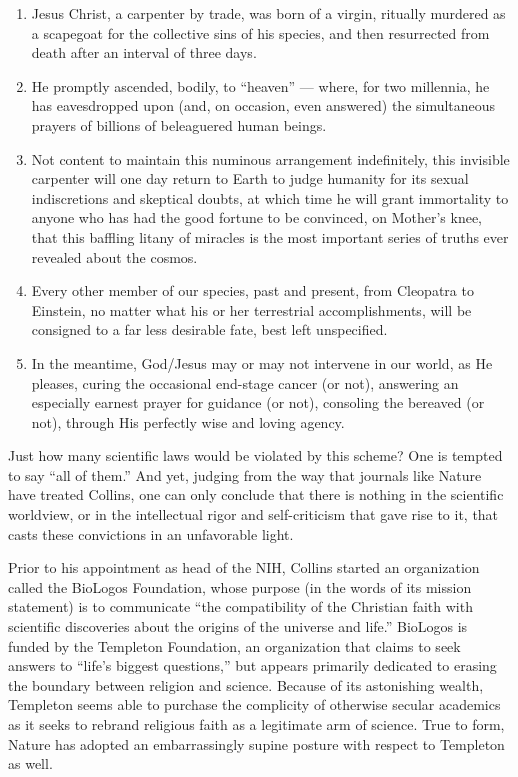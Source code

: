 \documentclass[a4paper,14pt]{extarticle}
\begin{document}
\begin{enumerate}
      \item
            Jesus Christ, a carpenter by trade, was born of a virgin, ritually murdered as a scapegoat for the collective sins of his species, and then resurrected from death after an interval of three days.
      \item
            He promptly ascended, bodily, to ``heaven'' --- where, for two millennia, he has eavesdropped upon (and, on occasion, even answered) the simultaneous prayers of billions of beleaguered human beings.
      \item
            Not content to maintain this numinous arrangement indefinitely, this invisible carpenter will one day return to Earth to judge humanity for its sexual indiscretions and skeptical doubts, at which time he will grant immortality to anyone who has had the good fortune to be convinced, on Mother’s knee, that this baffling litany of miracles is the most important series of truths ever revealed about the cosmos.
      \item
            Every other member of our species, past and present, from Cleopatra to Einstein, no matter what his or her terrestrial accomplishments, will be consigned to a far less desirable fate, best left unspecified.
      \item
            In the meantime, God/Jesus may or may not intervene in our world, as He pleases, curing the occasional end-stage cancer (or not), answering an especially earnest prayer for guidance (or not), consoling the bereaved (or not), through His perfectly wise and loving agency.
\end{enumerate}

Just how many scientific laws would be violated by this scheme?
One is tempted to say ``all of them.''
And yet, judging from the way that journals like Nature have treated Collins, one can only conclude that there is nothing in the scientific worldview, or in the intellectual rigor and self-criticism that gave rise to it, that casts these convictions in an unfavorable light.

Prior to his appointment as head of the NIH, Collins started an organization called the BioLogos Foundation, whose purpose (in the words of its mission statement) is to communicate ``the compatibility of the Christian faith with scientific discoveries about the origins of the universe and life.''
BioLogos is funded by the Templeton Foundation, an organization that claims to seek answers to ``life’s biggest questions,'' but appears primarily dedicated to erasing the boundary between religion and science.
Because of its astonishing wealth, Templeton seems able to purchase the complicity of otherwise secular academics as it seeks to rebrand religious faith as a legitimate arm of science.
True to form, Nature has adopted an embarrassingly supine posture with respect to Templeton as well.
\end{document}

